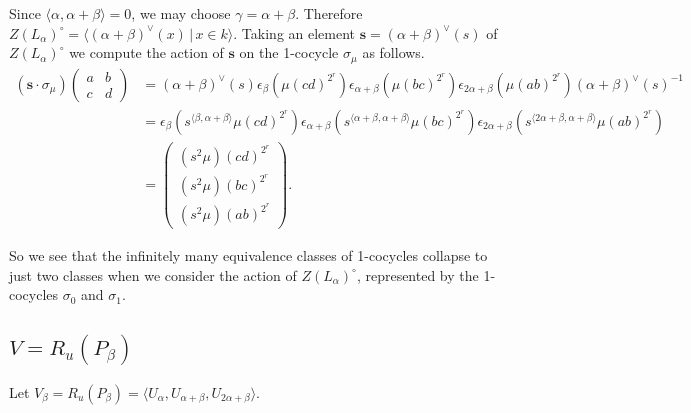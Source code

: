 Since $\langle \alpha, \alpha + \beta\rangle = 0$, we may choose $\gamma = \alpha + \beta$.
Therefore $Z(L_ \alpha)^\circ = \langle (\alpha + \beta)^\vee(x)\,|\,x \in k \rangle$. Taking an element $\mathbf{s} = (\alpha + \beta)^\vee(s)$ of $Z(L_\alpha)^\circ$ we compute the action of $\mathbf{s}$ on the 1-cocycle $\sigma_\mu$ as follows.
\begin{align*}
\left(\mathbf{s}\cdot \sigma_\mu\right)
\left(\begin{matrix} a & b \\ c & d\end{matrix} \right) 
&=
(\alpha + \beta)^\vee(s) \epsilon_\beta \left(\mu (cd)^{2^r} \right)\epsilon_{\alpha+\beta} \left(\mu(bc)^{2^r} \right)\epsilon_{2\alpha + \beta} \left(\mu(ab)^{2^r} \right)(\alpha + \beta)^\vee(s)^{-1}\\
&=  \epsilon_\beta\left(s^{\langle\beta , \alpha+\beta\rangle}\mu (cd)^{2^r} \right)\epsilon_{\alpha+\beta} \left(s^{\langle \alpha+\beta, \alpha+\beta \rangle} \mu(bc)^{2^r} \right)\epsilon_{2\alpha + \beta} \left(s^{\langle 2\alpha+\beta, \alpha+\beta\rangle}\mu(ab)^{2^r}\right) \\
&=
\left(\begin{matrix}
(s^2\mu)(cd)^{2^r} \\
(s^2\mu)(bc)^{2^r} \\
(s^2\mu)(ab)^{2^r}
\end{matrix}\right).
\end{align*}

So we see that the infinitely many equivalence classes of 1-cocycles collapse to just two classes when we consider the action of $Z(L_\alpha)^\circ$, represented by the 1-cocycles $\sigma_0$ and $\sigma_1$.

\subsection{$V = R_u(P_\beta)$}
\label{b2:beta}

Let $V_\beta = R_u(P_\beta) = \langle U_\alpha, U_{\alpha + \beta}, U_{2\alpha + \beta} \rangle$.

